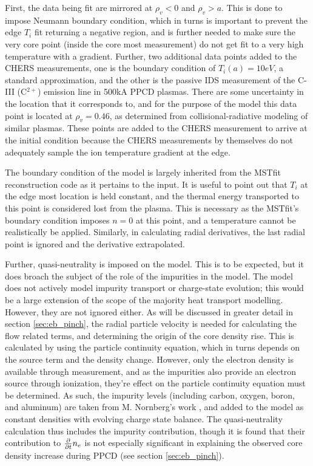 First, the data being fit are mirrored at $\rho_v < 0$ and $\rho_v > a$. This is done to impose Neumann boundary condition, which in turns is important to prevent the edge $T_i$ fit returning a negative region, and is further needed to make sure the very core point (inside the core most measurement) do not get fit to a very high temperature with a gradient. Further, two additional data points added to the CHERS measurements, one is the boundary condition of $T_i(a) = 10eV$, a standard approximation, and the other is the passive IDS measurement of the C-III (C$^{2+}$) emission line in 500kA PPCD plasmas. There are some uncertainty in the location that it corresponds to, and for the purpose of the model this data point is located at $\rho_v = 0.46$, as determined from collisional-radiative modeling of similar plasmas\cite{Nishizawa2018,Barbui2014}. These points are added to the CHERS measurement to arrive at the initial condition because the CHERS measurements by themselves do not adequately sample the ion temperature gradient at the edge.

The boundary condition of the model is largely inherited from the MSTfit reconstruction code \cite{Anderson2001} as it pertains to the input. It is useful to point out that $T_i$ at the edge most location is held constant, and the thermal energy transported to this point is considered lost from the plasma. This is necessary as the MSTfit's boundary condition imposes $n = 0$ at this point, and a temperature cannot be realistically be applied. Similarly, in calculating radial derivatives, the last radial point is ignored and the derivative extrapolated.

Further, quasi-neutrality is imposed on the model. This is to be expected, but it does broach the subject of the role of the impurities in the model. The model does not actively model impurity transport or charge-state evolution; this would be a large extension of the scope of the majority heat transport modelling. However, they are not ignored either. As will be discussed in greater detail in section \ref{sec:eb_pinch}, the radial particle velocity is needed for calculating the flow related terms, and determining the origin of the core density rise. This is calculated by using the particle continuity equation, which in turns depends on the source term and the density change. However, only the electron density is available through measurement, and as the impurities also provide an electron source through ionization, they're effect on the particle continuity equation must be determined. As such, the impurity levels (including carbon, oxygen, boron, and aluminum) are taken from M. Nornberg's work \cite{Nornberg2018}, and added to the model as constant densities with evolving charge state balance. The quasi-neutrality calculation thus includes the impurity contribution, though it is found that their contribution to $\frac{\partial}{\partial t} n_e$ is not especially significant in explaining the observed core density increase during PPCD (see section \ref{sec:eb_pinch}).


